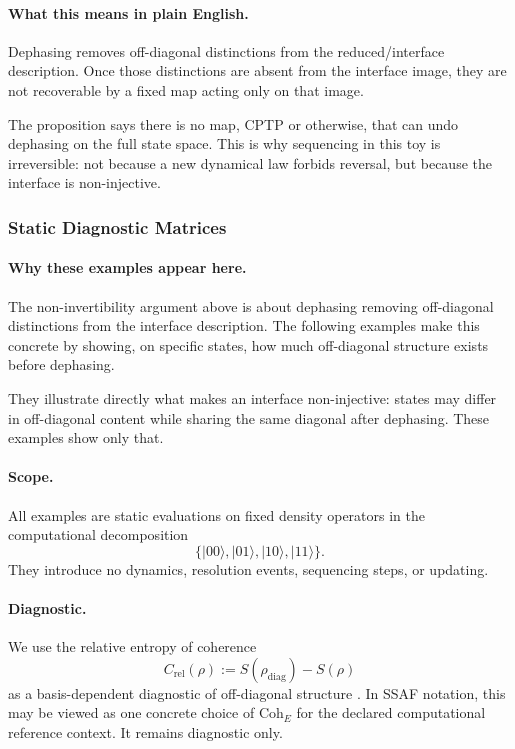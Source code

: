 \documentclass[aps,prx,onecolumn,11pt]{revtex4-2}
\theoremstyle{plain}
\theoremstyle{definition}
\theoremstyle{remark}
\begin{document}
\paragraph{What this means in plain English.}

Dephasing removes off-diagonal distinctions from the reduced/interface
description. Once those distinctions are absent from the interface
image, they are not recoverable by a fixed map acting only on that
image.

The proposition says there is no map, CPTP or otherwise, that can undo
dephasing on the full state space. This is why sequencing in this toy
is irreversible: not because a new dynamical law forbids reversal, but
because the interface is non-injective.

\subsubsection{Static Diagnostic Matrices}
\label{toy:two_qubit_static_examples}

\paragraph{Why these examples appear here.}

The non-invertibility argument above is about dephasing removing
off-diagonal distinctions from the interface description. The following
examples make this concrete by showing, on specific states, how much
off-diagonal structure exists before dephasing.

They illustrate directly what makes an interface non-injective: states
may differ in off-diagonal content while sharing the same diagonal after
dephasing. These examples show only that.

\paragraph{Scope.}

All examples are static evaluations on fixed density operators in the
computational decomposition
\[
\{|00\rangle, |01\rangle, |10\rangle, |11\rangle\}.
\]
They introduce no dynamics, resolution events, sequencing steps, or
updating.

\paragraph{Diagnostic.}

We use the relative entropy of coherence
\[
C_{\mathrm{rel}}(\rho)
:=
S(\rho_{\mathrm{diag}})-S(\rho)
\]
as a basis-dependent diagnostic of off-diagonal structure
\cite{Baumgratz2014,ChitambarGour2019}. In SSAF notation, this may be
viewed as one concrete choice of \(\mathrm{Coh}_E\) for the declared
computational reference context. It remains diagnostic only.
\end{document}
